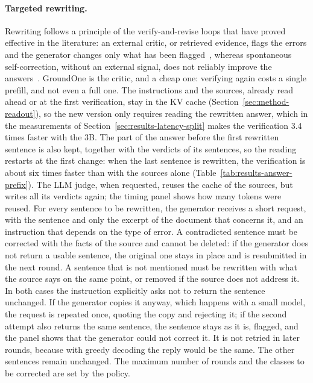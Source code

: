 \paragraph{Targeted rewriting.} Rewriting follows a principle of the verify-and-revise loops that have proved effective
in the literature: an external critic, or retrieved evidence, flags the errors and the generator changes only what has
been flagged~\cite{gao2023rarr,gou2024critic}, whereas spontaneous self-correction, without an external signal, does not
reliably improve the answers~\cite{huang2024cannotselfcorrect}. GroundOne is the critic, and a cheap one: verifying again costs a single prefill, and not even a full one. The instructions and the sources, already read ahead or at the first verification, stay in the KV cache (Section~\ref{sec:method-readout}), so the new version only requires reading the rewritten answer, which in the measurements of Section~\ref{sec:results-latency-split} makes the verification 3.4 times faster with the 3B. The part of the answer before the first rewritten sentence is also kept, together with the verdicts of its sentences, so the reading restarts at the first change: when the last sentence is rewritten, the verification is about six times faster than with the sources alone (Table~\ref{tab:results-answer-prefix}). The LLM judge, when requested, reuses the cache of the sources, but writes all its verdicts again; the timing panel shows how many tokens were reused. For every sentence to be rewritten, the generator receives a short request, with the
sentence and only the excerpt of the document that concerns it, and an instruction that depends on the type of error. A
contradicted sentence must be corrected with the facts of the source and cannot be deleted: if the generator does not
return a usable sentence, the original one stays in place and is resubmitted in the next round. A sentence that is not
mentioned must be rewritten with what the source says on the same point, or removed if the source does not address it. In both cases the instruction explicitly asks not to return the sentence unchanged. If the generator copies it anyway, which happens with a small model, the request is repeated once, quoting the copy and rejecting it; if the second attempt also returns the same sentence, the sentence stays as it is, flagged, and the panel shows that the generator could not correct it. It is not retried in later rounds, because with greedy decoding the reply would be the same. The other sentences remain unchanged. The maximum number of rounds and the classes to be corrected are set by the
policy.

